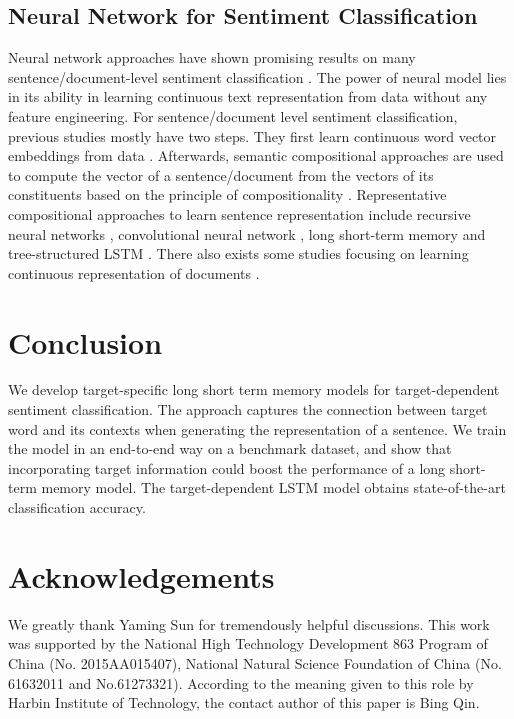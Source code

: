 \documentclass[11pt]{article}
\begin{document}
\subsection{Neural Network for Sentiment Classification}
Neural network approaches have shown promising results on many sentence/document-level sentiment classification \cite{Socher2013a,Tang2015}. The power of neural model lies in its ability in learning continuous text representation from data without any feature engineering. 
For sentence/document level sentiment classification, previous studies mostly have two steps. They first learn continuous word vector embeddings from data \cite{Bengio2003,Mikolov2013a,Pennington2014}. Afterwards, semantic compositional approaches are used to compute the vector of a sentence/document from the vectors of its constituents based on the principle of compositionality \cite{Frege1892}. 
Representative compositional approaches to learn sentence representation include recursive neural networks \cite{Socher2013a,Irsoy2014nips}, convolutional neural network \cite{Kalchbrenner2014,Kim2014}, long short-term memory \cite{Li2015a} and tree-structured LSTM \cite{Tai2015,Zhu2015}.
There also exists some studies focusing on learning continuous representation of documents \cite{Le2014,Tang2015,Bhatia2015,Yang2016hierarchical}.


\section{Conclusion}
We develop target-specific long short term memory models for target-dependent sentiment classification.
The approach captures the connection between target word and its contexts when generating the representation of a sentence. 
We train the model in an end-to-end way on a benchmark dataset, and show that incorporating target information could boost the performance of a long short-term memory model.
The target-dependent LSTM model obtains state-of-the-art classification accuracy. 

\section*{Acknowledgements}
We greatly thank Yaming Sun for tremendously helpful discussions. 
This work was supported by the National High Technology Development 863 Program of China (No. 2015AA015407), National Natural Science Foundation of China (No. 61632011 and No.61273321).
According to the meaning given to this role by Harbin Institute of Technology, the contact author of this paper is Bing Qin.



\end{document}
